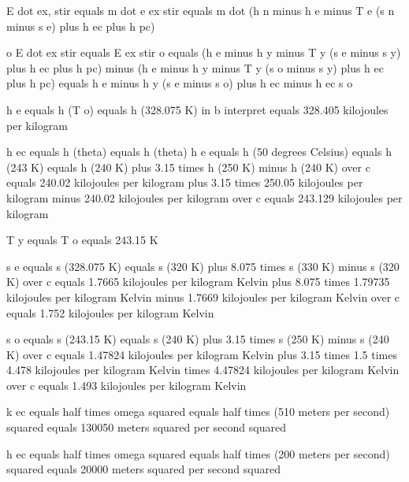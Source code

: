 E dot ex, stir equals m dot e ex stir equals m dot (h n minus h e minus T e (s n minus s e) plus h ec plus h pc)

o E dot ex stir equals E ex stir o equals (h e minus h y minus T y (s e minus s y) plus h ec plus h pc) minus (h e minus h y minus T y (s o minus s y) plus h ec plus h pc)
equals h e minus h y (s e minus s o) plus h ec minus h ec s o

h e equals h (T o) equals h (328.075 K) in b interpret
equals 328.405 kilojoules per kilogram

h ec equals h (theta) equals h (theta)
h e equals h (50 degrees Celsius) equals h (243 K)
equals h (240 K) plus 3.15 times h (250 K) minus h (240 K) over c
equals 240.02 kilojoules per kilogram plus 3.15 times 250.05 kilojoules per kilogram minus 240.02 kilojoules per kilogram over c
equals 243.129 kilojoules per kilogram

T y equals T o equals 243.15 K

s e equals s (328.075 K)
equals s (320 K) plus 8.075 times s (330 K) minus s (320 K) over c
equals 1.7665 kilojoules per kilogram Kelvin plus 8.075 times 1.79735 kilojoules per kilogram Kelvin minus 1.7669 kilojoules per kilogram Kelvin over c
equals 1.752 kilojoules per kilogram Kelvin

s o equals s (243.15 K)
equals s (240 K) plus 3.15 times s (250 K) minus s (240 K) over c
equals 1.47824 kilojoules per kilogram Kelvin plus 3.15 times 1.5 times 4.478 kilojoules per kilogram Kelvin times 4.47824 kilojoules per kilogram Kelvin over c
equals 1.493 kilojoules per kilogram Kelvin

k ec equals half times omega squared
equals half times (510 meters per second) squared
equals 130050 meters squared per second squared

h ec equals half times omega squared
equals half times (200 meters per second) squared
equals 20000 meters squared per second squared